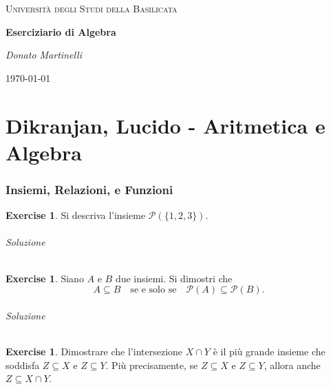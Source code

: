 \documentclass{article}
\theoremstyle{plain}
\theoremstyle{definition}
\newtheorem{xca}[exmp]{Exercise}
\theoremstyle{remark}
\begin{document}
\begin{titlepage}
    \centering
	{\textsc{Università degli Studi della Basilicata} \par}
	\vspace{2cm}
    {\huge\bfseries Eserciziario di Algebra\par}
    \vfill
	{\Large\itshape Donato Martinelli\par}
	{\large \today\par}
\end{titlepage}

\tableofcontents

\part{Dikranjan, Lucido - Aritmetica e Algebra}

\newpage
\section{Insiemi, Relazioni, e Funzioni}
\vspace{20pt}

\begin{bxthm}
\begin{xca}
Si descriva l'insieme $\mathcal{P}(\{1,2,3\})$.
\end{xca}
\end{bxthm}
\paragraph{Soluzione}

\begin{bxthm}
\begin{xca}
Siano $A$ e $B$ due insiemi. Si dimostri che
\[
A \subseteq B \quad \text{se e solo se} \quad \mathcal{P}(A) \subseteq \mathcal{P}(B).
\]
\end{xca}
\end{bxthm}
\paragraph{Soluzione}

\begin{bxthm}
\begin{xca}
Dimostrare che l'intersezione $X \cap Y$ è il più grande insieme che soddisfa 
$Z \subseteq X$ e $Z \subseteq Y$. Più precisamente, se $Z \subseteq X$ e $Z \subseteq Y$, allora anche 
$Z \subseteq X \cap Y$.
\end{xca}
\end{bxthm}
\end{document}
